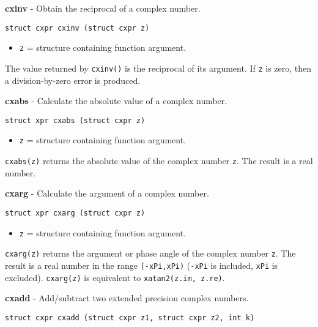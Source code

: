\documentclass{article}
\begin{document}
\hrulefill{}

\textbf{cxinv} - Obtain the reciprocal of a complex number.

\begin{verbatim}
struct cxpr cxinv (struct cxpr z)
\end{verbatim}

\begin{itemize}
\item \texttt{z} = structure containing function argument.
\end{itemize}

The value returned by \texttt{cxinv()} is the
reciprocal of its argument. If \texttt{z} is zero,
then a division-by-zero error is produced.


\hrulefill{}

\textbf{cxabs} - Calculate the absolute value of a complex number.

\begin{verbatim}
struct xpr cxabs (struct cxpr z)
\end{verbatim}

\begin{itemize}
\item \texttt{z} = structure containing function argument.
\end{itemize}

\texttt{cxabs(z)} returns the absolute value of the complex number \texttt{z}.
The result is a real number.


\hrulefill{}

\textbf{cxarg} - Calculate the argument of a complex number.

\begin{verbatim}
struct xpr cxarg (struct cxpr z)
\end{verbatim}

\begin{itemize}
\item \texttt{z} = structure containing function argument.
\end{itemize}

\texttt{cxarg(z)} returns the argument or phase angle 
of the complex number \texttt{z}. The result is a real number
in the range \texttt{[-xPi,xPi)} (\texttt{-xPi} is included, \texttt{xPi} is excluded).
\texttt{cxarg(z)} is equivalent to \texttt{xatan2(z.im, z.re)}.


\hrulefill{}

\textbf{cxadd} - Add/subtract two extended precision complex numbers.

\begin{verbatim}
struct cxpr cxadd (struct cxpr z1, struct cxpr z2, int k)
\end{verbatim}
\end{document}
